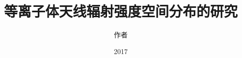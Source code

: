 \documentclass[bachelor]{uestcthesis}
\title{等离子体天线辐射强度空间分布的研究}%
\author{作者}%
\date{2017}{5}{1}%
\begin{document}
\rm





\end{document}
